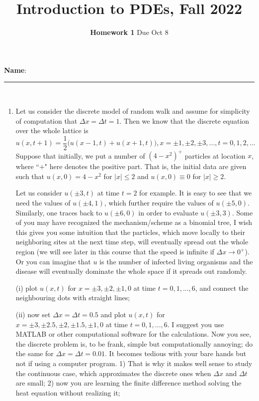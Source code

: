 \documentclass[6pt]{article}
\title{Introduction to PDEs, Fall 2022}
\author{\textbf{Homework 1} Due Oct 8}
\date{}
\numberwithin{equation}{section}
\begin{document}
\maketitle

\textbf{Name}:\rule{1 in}{0.001 in} \\
\begin{enumerate}

\item Let us consider the discrete model of random walk and assume for simplicity of computation that $\Delta x=\Delta t=1$.  Then we know that the discrete equation over the whole lattice is
\begin{equation}\label{discrete}
u(x,t+1)=\frac{1}{2}\big(u(x-1,t)+u(x+1,t)\big), x=\pm 1,\pm2, \pm3,..., t=0,1,2,...
\end{equation}
Suppose that initially, we put a number of $(4-x^2)^+$ particles at location $x$, where ``$+$" here denotes the positive part.  That is, the initial data are given such that $u(x,0)=4-x^2$ for $|x|\leq2$ and $u(x,0)\equiv0$ for $|x|\geq2$.

Let us consider $u(\pm3,t)$ at time $t=2$ for example.  It is easy to see that we need the values of $u(\pm4,1)$, which further require the values of $u(\pm 5,0)$.  Similarly, one traces back to $u(\pm6,0)$ in order to evaluate $u(\pm3,3)$.  Some of you may have recognized the mechanism/scheme as a binomial tree, I wish this gives you some intuition that the particles, which move locally to their neighboring sites at the next time step, will eventually spread out the whole region (we will see later in this course that the speed is infinite if $\Delta x\rightarrow 0^+$).  Or you can imagine that $u$ is the number of infected living organisms and the disease will eventually dominate the whole space if it spreads out randomly.

(i) plot $u(x,t)$ for $x=\pm3,\pm2,\pm1,0$ at time $t=0,1,...,6$, and connect the neighbouring dots with straight lines;

(ii) now set $\Delta x=\Delta t=0.5$ and plot $u(x,t)$ for $x=\pm3,\pm 2.5,\pm2,\pm 1.5,\pm1,0$ at time $t=0,1,...,6$. I suggest you use MATLAB or other computational software for the calculations.  Now you see, the discrete problem is, to be frank, simple but computationally annoying; do the same for $\Delta x=\Delta t=0.01$.  It becomes tedious with your bare hands but not if using a computer program.  1) That is why it makes well sense to study the continuous case, which approximates the discrete ones when $\Delta x$ and $\Delta t$ are small; 2) now you are learning the finite difference method solving the heat equation without realizing it;


\end{enumerate}
\end{document}
